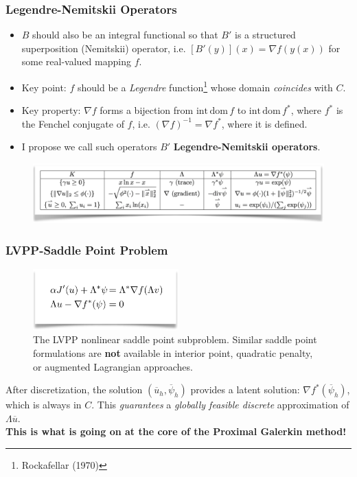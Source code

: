 \documentclass[aspectratio=169,xcolor=dvipsnames,11pt]{beamer}
\begin{document}
\begin{frame}\frametitle{Legendre-Nemitskii Operators}
\begin{itemize}
\item $B$ should also be an integral functional so that $B'$ is a structured superposition (Nemitskii) operator, i.e. $[B'(y)](x) = \nabla f(y(x))$ for some real-valued mapping $f$. \pause
\item Key point: $f$ should be a \textit{Legendre} function\footnote{\tiny Rockafellar (1970)} whose domain \textit{coincides} with $C$. \pause
\item Key property: $\nabla f$ forms a bijection from $\mathrm{int\, dom\,} f$ to $\mathrm{int\, dom\,} f^*$, where $f^*$ is the Fenchel conjugate of $f$, i.e. $(\nabla f)^{-1} = \nabla f^*$, where it is defined.\pause
\item I propose we call such operators $B'$ \textbf{Legendre-Nemitskii operators}.
\end{itemize}\pause
\begin{figure}[h]
\includegraphics[width=0.85\linewidth]{Figures/lvpp-transform-table.png} 
\end{figure}
\end{frame}

\begin{frame}\frametitle{LVPP-Saddle Point Problem}
\begin{figure}[h]
\includegraphics[width=0.5\textwidth, keepaspectratio]{Figures/lvpp-spp.png}
\caption{The LVPP nonlinear saddle point subproblem. Similar saddle point formulations are \textbf{not} available in interior point, quadratic penalty, or augmented Lagrangian approaches.}
\end{figure}
\begin{center}
 After discretization, the solution $(\overline{u}_h,\overline{\psi}_{h})$ provides a latent solution: $\nabla f^*(\overline{\psi}_h)$, which is always in $C$. This \textit{guarantees} a \textit{globally feasible discrete} approximation of $\Lambda \overline{u}$. \\ \textbf{This is what is going on at the core of the Proximal Galerkin method!}
\end{center}
\end{frame}
\end{document}
